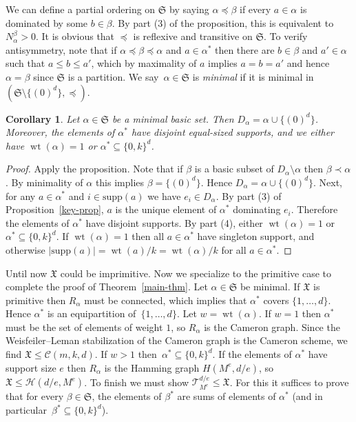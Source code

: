 \documentclass[10pt]{article}
\newtheorem{cor}[theorem]{Corollary}
\newcommand{\cT}{{\mathcal T}}
\newcommand{\cC}{{\mathcal C}}
\newcommand{\cH}{{\mathcal H}}
\newcommand{\fS}{\mathfrak S}
\newcommand{\wt}{\operatorname{wt}}
\newcommand{\supp}{\mathrm{supp}}
\def\X{\mathfrak{X}}
\renewcommand{\subset}{\subseteq}
\begin{document}
We can define a partial ordering on $\fS$ by saying $\alpha \preceq \beta$ if every $a \in \alpha$ is dominated by some $b \in \beta$.
By part (3) of the proposition, this is equivalent to $N^\beta_\alpha > 0$.
It is obvious that $\preceq$ is reflexive and transitive on $\fS$.
To verify antisymmetry, note that if $\alpha \preceq \beta \preceq \alpha$ and $a \in \alpha^*$ then there are $b \in \beta$ and $a' \in \alpha$ such that $a \le b \le a'$, which by maximality of $a$ implies $a = b = a'$ and hence $\alpha = \beta$ since $\fS$ is a partition.
We say~$\alpha \in \fS$ is \emph{minimal} if it is minimal in $(\fS \setminus \{(0)^d\}, \preceq)$.

\begin{cor}
    Let $\alpha \in \fS$ be a minimal basic set.
    Then $D_\alpha = \alpha \cup \{(0)^d\}$.
    Moreover, the elements of $\alpha^*$ have disjoint equal-sized supports,
    and we either have $\wt(\alpha) = 1$ or $\alpha^* \subset \{0, k\}^d$.
\end{cor}
\begin{proof}
    Apply the proposition.
    Note that if $\beta$ is a basic subset of $D_\alpha \setminus \alpha$ then $\beta \prec \alpha$.
    By minimality of $\alpha$ this implies $\beta = \{(0)^d\}$.
    Hence $D_\alpha = \alpha \cup \{(0)^d\}$.
    Next,
    for any $a \in \alpha^*$ and $i \in \supp(a)$ we have $e_i \in D_\alpha$.
    By part (3) of Proposition~\ref{key-prop}, $a$ is the unique element of $\alpha^*$ dominating $e_i$.
    Therefore the elements of $\alpha^*$ have disjoint supports.
    By part (4), either $\wt(\alpha) = 1$ or $\alpha^* \subset \{0, k\}^d$.
    If $\wt(\alpha) = 1$ then all $a \in \alpha^*$ have singleton support,
    and otherwise $|\supp(a)| = \wt(a) / k = \wt(\alpha) / k$ for all $a \in \alpha^*$.
\end{proof}

Until now $\X$ could be imprimitive.
Now we specialize to the primitive case to complete the proof of Theorem~\ref{main-thm}.
Let $\alpha \in \fS$ be minimal.
If $\X$ is primitive then $R_\alpha$ must be connected,
which implies that $\alpha^*$ covers $\{1, \dots, d\}$.
Hence $\alpha^*$ is an equipartition of~$\{1, \dots ,d\}$.
Let $w = \wt(\alpha)$.
If $w = 1$ then $\alpha^*$ must be the set of elements of weight $1$, so $R_\alpha$ is the Cameron graph.
Since the Weisfeiler--Leman stabilization of the Cameron graph is the Cameron scheme, we find $\X \le \cC(m, k, d)$.
If $w > 1$ then~$\alpha^* \subset \{0, k\}^d$.
If the elements of $\alpha^*$ have support size $e$ 
then $R_\alpha$ is the Hamming graph $H(M^e, d/e)$, so $\X \le \cH(d/e, M^e)$.
To finish we must show $\cT_{M^e}^{d/e} \le \X$.
For this it suffices to prove that for every $\beta \in \fS$, the elements of $\beta^*$ are sums of elements of $\alpha^*$ (and in particular~$\beta^* \subset \{0, k\}^d$).
\end{document}
